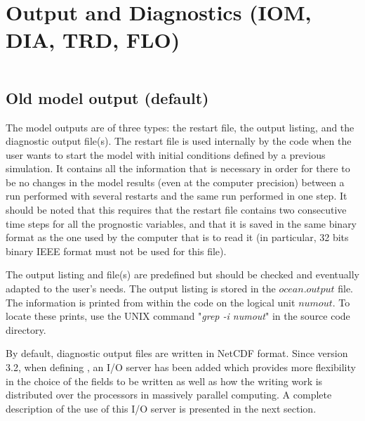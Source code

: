 \documentclass[../tex_main/NEMO_manual]{subfiles}
\begin{document}
\chapter{Output and Diagnostics (IOM, DIA, TRD, FLO)}
\label{chap:DIA}
\minitoc

\newpage
$\ $\newline    %

\section{Old model output (default)}
\label{sec:DIA_io_old}

The model outputs are of three types: the restart file, the output listing, and the diagnostic output file(s).
The restart file is used internally by the code when the user wants to start the model with
initial conditions defined by a previous simulation.
It contains all the information that is necessary in order for there to be no changes in the model results
(even at the computer precision) between a run performed with several restarts and
the same run performed in one step.
It should be noted that this requires that the restart file contains two consecutive time steps for
all the prognostic variables, and that it is saved in the same binary format as the one used by the computer that
is to read it (in particular, 32 bits binary IEEE format must not be used for this file).

The output listing and file(s) are predefined but should be checked and eventually adapted to the user's needs.
The output listing is stored in the $ocean.output$ file.
The information is printed from within the code on the logical unit $numout$.
To locate these prints, use the UNIX command "\textit{grep -i numout}" in the source code directory.

By default, diagnostic output files are written in NetCDF format.
Since version 3.2, when defining , an I/O server has been added which
provides more flexibility in the choice of the fields to be written as well as how
the writing work is distributed over the processors in massively parallel computing.
A complete description of the use of this I/O server is presented in the next section.
\end{document}
